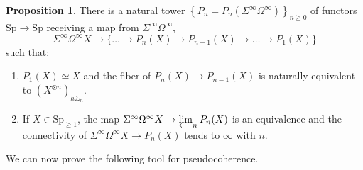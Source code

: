 \documentclass{amsart}
\newcommand{\Sp}{\mathrm{Sp}}
\theoremstyle{definition}
\newtheorem{proposition}[definition]{Proposition}
\begin{document}
\begin{proposition} 
There is a natural tower $\left\{P_n=P_n ( \Sigma^\infty
\Omega^\infty)\right\}_{n \geq 0}$ of functors $\Sp \to \Sp$
receiving a map from $\Sigma^\infty \Omega^\infty$, 
\[ 
\Sigma^\infty \Omega^\infty X \to \{ \dots \to P_n
(X) \to P_{n-1}(X) \to \dots \to 
P_1(X) \}
\]
such that: 
\begin{enumerate}
\item $P_1(X) \simeq X$ and the fiber of  
$P_n (X) \to P_{n-1} (X) $ is naturally equivalent to $(X^{\otimes n})_{h \Sigma_n}$. 
\item If $X \in \Sp_{\geq 1}$, the map 
$\Sigma^\infty \Omega^\infty X  \to \varprojlim_n P_n (X)$ is an equivalence and
the connectivity of 
$\Sigma^\infty \Omega^\infty X \to P_n(X)$ tends to $\infty$ with $n$.
\end{enumerate}
\label{goodwilliefilt}
\end{proposition} 





We can now prove the following tool for pseudocoherence. 
\end{document}
